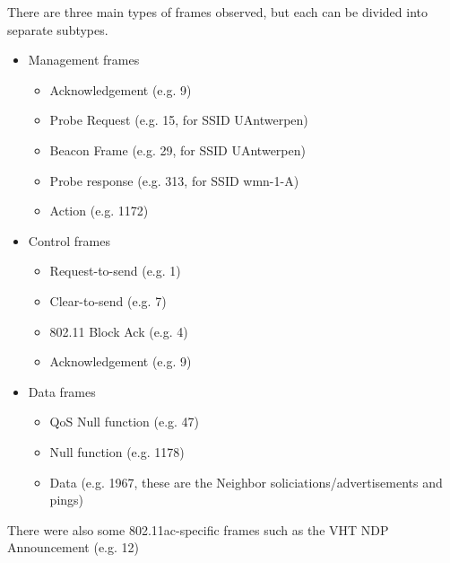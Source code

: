 There are three main types of frames observed, but each can be divided into separate subtypes. 
\begin{itemize}
\item Management frames
\begin{itemize}

\item Acknowledgement (e.g. 9)

\item Probe Request (e.g. 15, for SSID UAntwerpen)
\item Beacon Frame (e.g. 29, for SSID UAntwerpen)

\item Probe response (e.g. 313, for SSID wmn-1-A)
\item Action (e.g. 1172)
\end{itemize}

\item Control frames
\begin{itemize}
\item Request-to-send (e.g. 1)
\item Clear-to-send (e.g. 7)
\item 802.11 Block Ack (e.g. 4)
\item Acknowledgement (e.g. 9)
\end{itemize}
\item Data frames
\begin{itemize}
\item QoS Null function (e.g. 47)
\item Null function (e.g. 1178)
\item Data (e.g. 1967, these are the Neighbor soliciations/advertisements and pings)
\end{itemize}
\end{itemize}
There were also some 802.11ac-specific frames such as the VHT NDP Announcement (e.g. 12)
